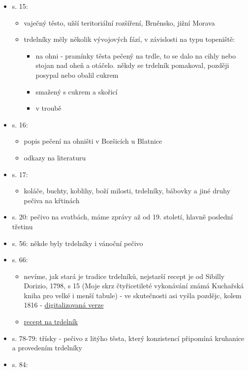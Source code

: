 \begin{itemize}
  \begin{itemize}
  \tightlist
  \item
    s. 15:

    \begin{itemize}
    \tightlist
    \item
      vaječný těsto, užší teritoriální rozšíření, Brněnsko, jižní Morava
    \item
      trdelníky měly několik vývojových fází, v závislosti na typu
      topeniště:

      \begin{itemize}
      \tightlist
      \item
        na ohni - pramínky těsta pečený na trdle, to se dalo na cihly
        nebo stojan nad oheň a otáčelo. někdy se trdelník pomakoval,
        později posypal nebo obalil cukrem
      \item
        smažený s cukrem a skořicí
      \item
        v troubě
      \end{itemize}
    \end{itemize}
  \item
    s. 16:

    \begin{itemize}
    \tightlist
    \item
      popis pečení na ohništi v Boršicích u Blatnice
    \item
      odkazy na literaturu
    \end{itemize}
  \item
    s. 17:

    \begin{itemize}
    \tightlist
    \item
      koláče, buchty, koblihy, boží milosti, trdelníky, bábovky a jiné
      druhy pečiva na křtinách
    \end{itemize}
  \item
    s. 20: pečivo na svatbách, máme zprávy až od 19. století, hlavně
    poslední třetinu
  \item
    s. 56: někde byly trdelníky i vánoční pečivo
  \item
    s. 66:

    \begin{itemize}
    \tightlist
    \item
      nevíme, jak stará je tradice trdelníků, nejstarší recept je od
      Sibilly Dorizio, 1798, s 15 (Moje skrz čtyřicetileté vykonávání
      známá Kuchařská kniha pro velké i menší tabule) - ve skutečnosti
      asi vyšla pozdějc, kolem 1816 -
      \href{https://books.google.cz/books?vid=NKP:1002400169&printsec=frontcover\#v=onepage&q&f=false}{digitalizovaná
      verze}
    \item
      \href{https://books.google.cz/books?vid=NKP:1002400169&printsec=frontcover\#v=onepage&q=trdel&f=false}{recept
      na trdelník}
    \end{itemize}
  \item
    s. 78-79: třísky - pečivo z litýho těsta, který konzistencí
    připomíná kruhanice a provedením trdelníky
  \item
    s. 84:


\end{itemize}
\end{itemize}
